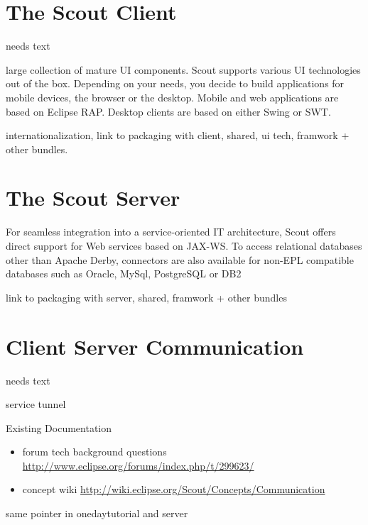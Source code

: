 \documentclass[a4paper,10pt,twoside]{book}
\begin{document}
\section{The Scout Client}
needs text

 large collection of mature UI components.
 Scout supports various UI technologies out of the box. 
 Depending on your needs, you decide to build applications for
mobile devices, the browser or the desktop. Mobile and
web applications are based on Eclipse RAP. Desktop clients
are based on either Swing or SWT.

internationalization, link to packaging with client, shared, ui tech, framwork + other bundles. 

\section{The Scout Server}

For seamless integration into a service-oriented IT architecture, Scout offers direct support for Web services based on
JAX-WS. To access relational databases other than Apache
Derby, connectors are also available for non-EPL compatible databases such as Oracle, MySql, PostgreSQL or DB2

link to packaging with server, shared, framwork + other bundles

\section{Client Server Communication}
needs text

service tunnel

\noindent Existing Documentation
\begin{itemize}
  \item forum tech background questions \url{http://www.eclipse.org/forums/index.php/t/299623/}
  \item concept wiki \url{http://wiki.eclipse.org/Scout/Concepts/Communication}
\end{itemize}

same pointer in onedaytutorial and server


\ifx\wholebook\relax\else
   
   
\end{document}
